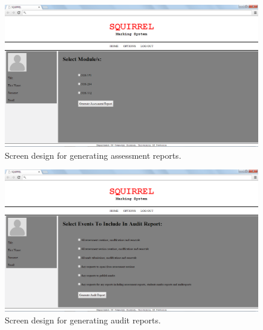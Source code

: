 \documentclass[11pt,a4paper]{article}
\begin{document}
		\begin{figure}[h!]
		\centering
		\includegraphics[width=1.0\linewidth]{./web_assessmentReport}
		\caption{Screen design for generating assessment reports.}
		\label{fig:web_assessmentReport}
		\end{figure}

					\begin{figure}[h]
					\centering
					\includegraphics[width=1.0\linewidth]{./web_auditReport}
					\caption{Screen design for generating audit reports.}
					\label{fig:web_auditReport}
					\end{figure}
			
\end{document}
